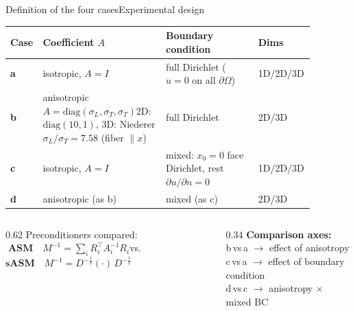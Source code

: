 \documentclass[aspectratio=169,10pt]{beamer}
\begin{document}
\begin{frame}{Definition of the four cases}{Experimental design}
  \footnotesize
  \renewcommand{\arraystretch}{1.45}
  \begin{tabular}{@{}p{0.05\linewidth} p{0.40\linewidth} p{0.30\linewidth} p{0.13\linewidth}@{}}
  \toprule
  \rowcolor{navy!100}\color{white}\textbf{Case} & \color{white}\textbf{Coefficient $A$} & \color{white}\textbf{Boundary condition} & \color{white}\textbf{Dims}\\
  \midrule
  \textcolor{asm}{\textbf{a}} & isotropic, $A=I$ & full Dirichlet ($u=0$ on all $\partial\Omega$) & 1D/2D/3D\\
  \textcolor{asm}{\textbf{b}} & anisotropic $A=\mathrm{diag}(\sigma_L,\sigma_T,\sigma_T)$\newline 2D:$\mathrm{diag}(10,1)$, 3D: Niederer $\sigma_L/\sigma_T=7.58$ (fiber $\parallel x$) & full Dirichlet & 2D/3D\\
  \textcolor{asm}{\textbf{c}} & isotropic, $A=I$ & mixed: $x_0{=}0$ face Dirichlet, rest $\partial u/\partial n{=}0$ & 1D/2D/3D\\
  \textcolor{asm}{\textbf{d}} & anisotropic (as b) & mixed (as c) & 2D/3D\\
  \bottomrule
  \end{tabular}
  \vspace{0.8em}

  \begin{columns}[T]
  \begin{column}{0.62\linewidth}\footnotesize
   Preconditioners compared:\\[3pt]
   \textcolor{asm}{$\;\textbf{ASM}\quad M^{-1}=\sum_i R_i^{\top}A_i^{-1}R_i$}\qquad vs.\qquad
   \textcolor{sasm}{$\textbf{sASM}\quad M^{-1}=D^{-\frac12}(\cdot)\,D^{-\frac12}$}
  \end{column}
  \begin{column}{0.34\linewidth}\footnotesize\color{muted}
   \textbf{\color{teal}Comparison axes:}\\
   b\,vs\,a $\to$ effect of anisotropy\\
   c\,vs\,a $\to$ effect of boundary condition\\
   d\,vs\,c $\to$ anisotropy $\times$ mixed BC
  \end{column}
  \end{columns}
\end{frame}
\end{document}
